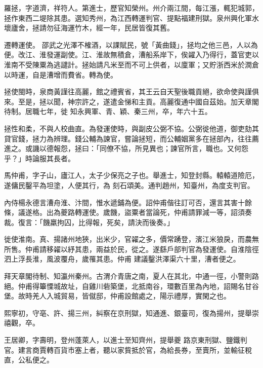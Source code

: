 \begin{pinyinscope}
 羅拯，字道濟，祥符人。第進士，歷官知榮州。州介兩江間，每江漲，輒犯城郭，拯作東西二堤除其患。選知秀州，為江西轉運判官、提點福建刑獄。泉州興化軍水壞廬舍，拯請勿征海運竹木，經一年，民居皆復其舊。



 遷轉運使。
 邵武之光澤不榷酒，以課賦民，號「黃曲錢」，拯均之他三邑，人以為便。改江、淮發運副使。江、淮故無積倉，漕船系岸下，俟糴入乃得行，蓋官吏以淮南不受陳粟為逃譴計。拯始請凡米至而不可上供者，以廩軍；又貯浙西米於潤倉以時運，自是漕增而費省。轉為使。



 拯使閩時，泉商黃謹往高麗，館之禮賓省，其王云自天聖後職貢絕，欲命使與謹俱來。至是，拯以聞，神宗許之，遂遣金悌和主貢。高麗復通中國自茲始。加天章閣待制。居職七年，徙
 知永興軍、青、穎、秦三州，卒，年六十五。



 拯性和柔，不與人校曲直。為發運使時，與副皮公弼不協。公弼徙他道，御吏劾其貸官錢，拯力為辨理。錢公輔為諫官，嘗論拯短，而公輔姻黨多在拯部內，往往薦進之。或譏以德報怨，拯曰：「同僚不協，所見異也；諫官所言，職也。又何怨乎？」時論服其長者。



 馬仲甫，字子山，廬江人，太子少保亮之子也。舉進士，知登封縣。轅轅道險厄，遂傭民鑿平為坦塗，人便其行，為
 刻石頌美。通判趙州，知臺州，為度支判官。



 內侍楊永德言漕舟淮、汴間，惟水遞鋪為便。詔仲甫偕往訂可否，還言其害十餘條，議遂格。出為夔路轉運使。歲饑，盜粟者當論死，仲甫請罪減一等，詔須奏裁。復言：「饑羸拘囚，比得報，死矣，請決而後奏。」



 徙使淮南。真、揚諸州地狹，出米少，官糴之多，價常踴登，濱江米狼戾，而農無所售。仲甫請移糴以紓其患，兩益於民，從之。遂繇戶部判官為發運使。自淮陰徑泗上浮長淮，風波覆舟，歲罹其患。仲甫
 建議鑿洪澤渠六十里，漕者便之。



 拜天章閣待制、知瀛州秦州。古渭介青唐之南，夏人在其北，中通一徑，小警則路絕。仲甫得篳慄城故址，自雞川砦築堡，北抵南谷，環數百里為內地，詔賜名甘谷堡。故時羌人入城貿易，皆僦邸，仲甫設館處之，陽示禮厚，實閑之也。



 熙寧初，守亳、許、揚三州，糾察在京刑獄，知通進、銀臺司，復為揚州，提舉崇禧觀，卒。



 王居卿，字壽明，登州蓬萊人，以進士至知齊州，提舉夔
 路京東刑獄、鹽鐵判官。建言商賈轉百貨市塞上者，聽以家貲抵於官，為給長券，至賣所，並輸征稅直，公私便之。




\end{pinyinscope}
